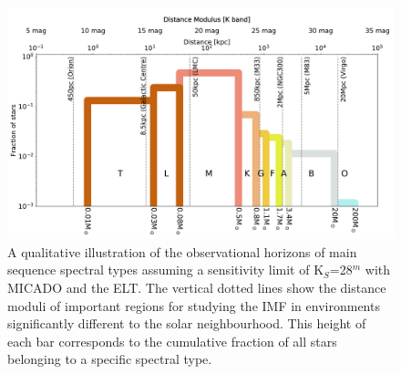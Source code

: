 \begin{figure}
    \centering
    \includegraphics[width=\textwidth]{images/imf_educational.pdf}
    \caption{A qualitative illustration of the observational horizons of main sequence spectral types assuming a sensitivity limit of K$_S$=28$^m$ with MICADO and the ELT. The vertical dotted lines show the distance moduli of important regions for studying the IMF in environments significantly different to the solar neighbourhood. This height of each bar corresponds to the cumulative fraction of all stars belonging to a specific spectral type.
    }
    \label{fig:imf_educational}
\end{figure}


